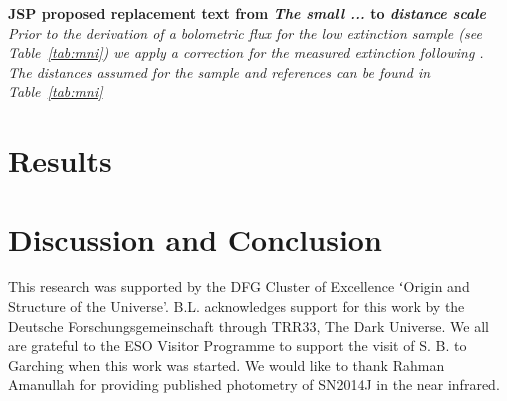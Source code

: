 \documentclass[traditabstract]{aa}
\begin{document}
{\bf JSP proposed replacement text  from {\em The small ...} to {\em distance scale}} {\it Prior to the  derivation of a bolometric flux for the low extinction sample (see Table~\ref{tab:mni}) we apply a correction for the measured extinction following \citet{Cardelli1989}. The distances assumed for the sample and references can be found in Table~\ref{tab:mni}}  





%

\section{Results}
\label{sec-res}


\section{Discussion and Conclusion}
\label{sec-dnc}






\begin{acknowledgements}
This research was supported by the DFG Cluster of Excellence ʻOrigin and
Structure of the Universe'.
B.L. acknowledges support for this work by the Deutsche
Forschungsgemeinschaft through TRR33, The Dark Universe. We all are grateful to the ESO Visitor Programme to support the visit of S. B. to Garching when this work was started.
We would like to thank Rahman Amanullah for providing published photometry of SN2014J in the near infrared. 

\end{acknowledgements}



%
\end{document}
